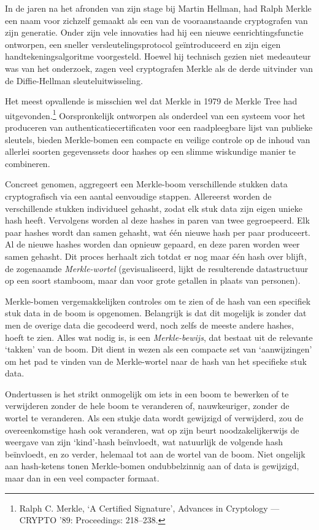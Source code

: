 \documentclass[
  a5paper,
  smalldemyvopaper,11pt,twoside,onecolumn,openright,extrafontsizes]{memoir}
\begin{document}
In de jaren na het afronden van zijn stage bij Martin Hellman, had Ralph
Merkle een naam voor zichzelf gemaakt als een van de vooraanstaande
cryptografen van zijn generatie. Onder zijn vele innovaties had hij een
nieuwe eenrichtingsfunctie ontworpen, een sneller versleutelingsprotocol
geïntroduceerd en zijn eigen handtekeningsalgoritme voorgesteld. Hoewel
hij technisch gezien niet medeauteur was van het onderzoek, zagen veel
cryptografen Merkle als de derde uitvinder van de Diffie-Hellman
sleuteluitwisseling.

Het meest opvallende is misschien wel dat Merkle in 1979 de Merkle Tree
had uitgevonden.\footnote{Ralph C. Merkle, `A Certified Signature',
  Advances in Cryptology --- CRYPTO '89: Proceedings: 218--238.}
Oorspronkelijk ontworpen als onderdeel van een systeem voor het
produceren van authenticatiecertificaten voor een raadpleegbare lijst
van publieke sleutels, bieden Merkle-bomen een compacte en veilige
controle op de inhoud van allerlei soorten gegevenssets door hashes op
een slimme wiskundige manier te combineren.

Concreet genomen, aggregeert een Merkle-boom verschillende stukken data
cryptografisch via een aantal eenvoudige stappen. Allereerst worden de
verschillende stukken individueel gehasht, zodat elk stuk data zijn
eigen unieke hash heeft. Vervolgens worden al deze hashes in paren van
twee gegroepeerd. Elk paar hashes wordt dan samen gehasht, wat één
nieuwe hash per paar produceert. Al de nieuwe hashes worden dan opnieuw
gepaard, en deze paren worden weer samen gehasht. Dit proces herhaalt
zich totdat er nog maar één hash over blijft, de zogenaamde
\emph{Merkle-wortel} (gevisualiseerd, lijkt de resulterende
datastructuur op een soort stamboom, maar dan voor grote getallen in
plaats van personen).

Merkle-bomen vergemakkelijken controles om te zien of de hash van een
specifiek stuk data in de boom is opgenomen. Belangrijk is dat dit
mogelijk is zonder dat men de overige data die gecodeerd werd, noch
zelfs de meeste andere hashes, hoeft te zien. Alles wat nodig is, is een
\emph{Merkle-bewijs}, dat bestaat uit de relevante `takken' van de boom.
Dit dient in wezen als een compacte set van `aanwijzingen' om het pad te
vinden van de Merkle-wortel naar de hash van het specifieke stuk data.

Ondertussen is het strikt onmogelijk om iets in een boom te bewerken of
te verwijderen zonder de hele boom te veranderen of, nauwkeuriger,
zonder de wortel te veranderen. Als een stukje data wordt gewijzigd of
verwijderd, zou de overeenkomstige hash ook veranderen, wat op zijn
beurt noodzakelijkerwijs de weergave van zijn `kind'-hash beïnvloedt,
wat natuurlijk de volgende hash beïnvloedt, en zo verder, helemaal tot
aan de wortel van de boom. Niet ongelijk aan hash-ketens tonen
Merkle-bomen ondubbelzinnig aan of data is gewijzigd, maar dan in een
veel compacter formaat.
\end{document}
